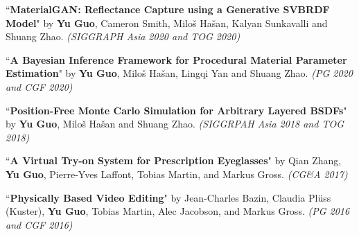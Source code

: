 \documentclass[margin,line]{resume}
\begin{document}
\begin{resume}
	\vspace{-5mm}
	
	``\textbf{MaterialGAN: Reflectance Capture using a Generative SVBRDF Model}" 
	by \textbf{Yu Guo}, Cameron Smith, Milo\v{s} Ha\v{s}an, Kalyan Sunkavalli and Shuang Zhao. 
	\textsl{(SIGGRAPH Asia 2020 and TOG 2020)}\\
	
	\vspace{-5mm}
	
	``\textbf{A Bayesian Inference Framework for Procedural Material Parameter Estimation}" 
	by \textbf{Yu Guo}, Milo\v{s} Ha\v{s}an, Lingqi Yan and Shuang Zhao. 
	\textsl{(PG 2020 and CGF 2020)}\\
	
	\vspace{-5mm}
	
	``\textbf{Position-Free Monte Carlo Simulation for Arbitrary Layered BSDFs}" 
	by \textbf{Yu Guo}, Milo\v{s} Ha\v{s}an and Shuang Zhao. 
	\textsl{(SIGGRPAH Asia 2018 and TOG 2018)}\\
	
	\vspace{-5mm}
	
	``\textbf{A Virtual Try-on System for Prescription Eyeglasses}" 
	by Qian Zhang, \textbf{Yu Guo}, Pierre-Yves Laffont, Tobias Martin, and Markus Gross. 
	\textsl{(CG\&A 2017)}\\
	
	\vspace{-5mm}
	
%	
	
	``\textbf{Physically Based Video Editing}" 
	by Jean-Charles Bazin, Claudia Pl\"{u}ss (Kuster), \textbf{Yu Guo}, Tobias Martin, Alec Jacobson, and Markus Gross. 
	\textsl{(PG 2016 and CGF 2016)}\\
	
	\vspace{-5mm}
	
%	
%	
%	
	

\end{resume}
\end{document}
